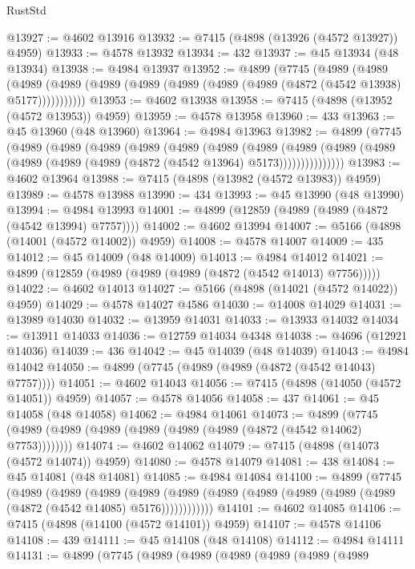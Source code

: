 \begin{lexlean}{RustStd}
\begin{coremodule}
@13927 := @4602 @13916
@13932 := @7415 (@4898 (@13926 (@4572 @13927)) @4959)
@13933 := @4578 @13932
@13934 := 432
@13937 := @45 @13934 (@48 @13934)
@13938 := @4984 @13937
@13952 := @4899
    (@7745
      (@4989
        (@4989
          (@4989 (@4989 (@4989 (@4989 (@4989 (@4989 (@4989 (@4872 (@4542 @13938) @5177)))))))))))
@13953 := @4602 @13938
@13958 := @7415 (@4898 (@13952 (@4572 @13953)) @4959)
@13959 := @4578 @13958
@13960 := 433
@13963 := @45 @13960 (@48 @13960)
@13964 := @4984 @13963
@13982 := @4899
    (@7745
      (@4989
        (@4989
          (@4989
            (@4989
              (@4989
                (@4989
                  (@4989
                    (@4989
                      (@4989 (@4989 (@4989 (@4989 (@4989 (@4872 (@4542 @13964) @5173)))))))))))))))
@13983 := @4602 @13964
@13988 := @7415 (@4898 (@13982 (@4572 @13983)) @4959)
@13989 := @4578 @13988
@13990 := 434
@13993 := @45 @13990 (@48 @13990)
@13994 := @4984 @13993
@14001 := @4899 (@12859 (@4989 (@4989 (@4872 (@4542 @13994) @7757))))
@14002 := @4602 @13994
@14007 := @5166 (@4898 (@14001 (@4572 @14002)) @4959)
@14008 := @4578 @14007
@14009 := 435
@14012 := @45 @14009 (@48 @14009)
@14013 := @4984 @14012
@14021 := @4899 (@12859 (@4989 (@4989 (@4989 (@4872 (@4542 @14013) @7756)))))
@14022 := @4602 @14013
@14027 := @5166 (@4898 (@14021 (@4572 @14022)) @4959)
@14029 := @4578 @14027 @4586
@14030 := @14008 @14029
@14031 := @13989 @14030
@14032 := @13959 @14031
@14033 := @13933 @14032
@14034 := @13911 @14033
@14036 := @12759 @14034 @4348
@14038 := @4696 (@12921 @14036)
@14039 := 436
@14042 := @45 @14039 (@48 @14039)
@14043 := @4984 @14042
@14050 := @4899 (@7745 (@4989 (@4989 (@4872 (@4542 @14043) @7757))))
@14051 := @4602 @14043
@14056 := @7415 (@4898 (@14050 (@4572 @14051)) @4959)
@14057 := @4578 @14056
@14058 := 437
@14061 := @45 @14058 (@48 @14058)
@14062 := @4984 @14061
@14073 := @4899 (@7745 (@4989 (@4989 (@4989 (@4989 (@4989 (@4989 (@4872 (@4542 @14062) @7753))))))))
@14074 := @4602 @14062
@14079 := @7415 (@4898 (@14073 (@4572 @14074)) @4959)
@14080 := @4578 @14079
@14081 := 438
@14084 := @45 @14081 (@48 @14081)
@14085 := @4984 @14084
@14100 := @4899
    (@7745
      (@4989
        (@4989
          (@4989
            (@4989 (@4989 (@4989 (@4989 (@4989 (@4989 (@4989 (@4872 (@4542 @14085) @5176))))))))))))
@14101 := @4602 @14085
@14106 := @7415 (@4898 (@14100 (@4572 @14101)) @4959)
@14107 := @4578 @14106
@14108 := 439
@14111 := @45 @14108 (@48 @14108)
@14112 := @4984 @14111
@14131 := @4899
    (@7745
      (@4989
        (@4989
          (@4989
            (@4989
              (@4989
                (@4989

\end{coremodule}
\end{lexlean}
